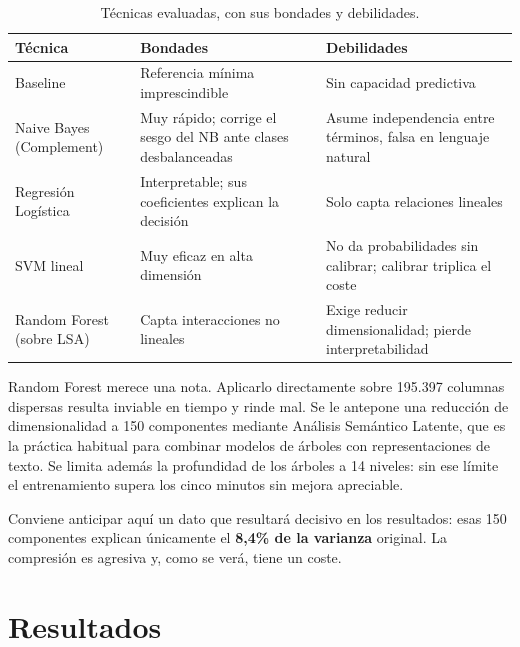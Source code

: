 \documentclass[11pt,a4paper]{article}
\begin{document}
\begin{table}[htbp]\centering\small
\caption{Técnicas evaluadas, con sus bondades y debilidades.}
\begin{tabular}{@{}p{2.9cm}p{5.3cm}p{5.3cm}@{}}
\toprule
\textbf{Técnica} & \textbf{Bondades} & \textbf{Debilidades} \\ \midrule
Baseline & Referencia mínima imprescindible & Sin capacidad predictiva \\
Naive Bayes (Complement) & Muy rápido; corrige el sesgo del NB ante clases desbalanceadas & Asume independencia entre términos, falsa en lenguaje natural \\
Regresión Logística & Interpretable; sus coeficientes explican la decisión & Solo capta relaciones lineales \\
SVM lineal & Muy eficaz en alta dimensión & No da probabilidades sin calibrar; calibrar triplica el coste \\
Random Forest (sobre LSA) & Capta interacciones no lineales & Exige reducir dimensionalidad; pierde interpretabilidad \\ \bottomrule
\end{tabular}
\end{table}

Random Forest merece una nota. Aplicarlo directamente sobre 195.397 columnas
dispersas resulta inviable en tiempo y rinde mal. Se le antepone una reducción
de dimensionalidad a 150 componentes mediante Análisis Semántico Latente, que es la práctica habitual para combinar modelos de
árboles con representaciones de texto. Se limita además la profundidad de los
árboles a 14 niveles: sin ese límite el entrenamiento supera los cinco minutos
sin mejora apreciable.

Conviene anticipar aquí un dato que resultará decisivo en los resultados: esas
150 componentes explican únicamente el \textbf{8,4\% de la varianza} original.
La compresión es agresiva y, como se verá, tiene un coste.

\section{Resultados}
\end{document}
